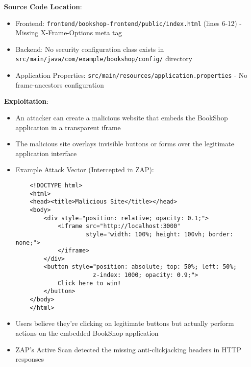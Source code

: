 \documentclass[]{UCD_CS_FYP_Report}
\begin{document}
\textbf{Source Code Location}: 
\begin{itemize}
    \item Frontend: \texttt{frontend/bookshop-frontend/public/index.html} (lines 6-12) - Missing X-Frame-Options meta tag
    \item Backend: No security configuration class exists in \texttt{src/main/java/com/example/bookshop/config/} directory
    \item Application Properties: \texttt{src/main/resources/application.properties} - No frame-ancestors configuration
\end{itemize}

\textbf{Exploitation}:
\begin{itemize}
    \item An attacker can create a malicious website that embeds the BookShop application in a transparent iframe
    \item The malicious site overlays invisible buttons or forms over the legitimate application interface
    \item Example Attack Vector (Intercepted in ZAP):
    \begin{verbatim}
    <!DOCTYPE html>
    <html>
    <head><title>Malicious Site</title></head>
    <body>
        <div style="position: relative; opacity: 0.1;">
            <iframe src="http://localhost:3000" 
                    style="width: 100%; height: 100vh; border: none;">
            </iframe>
        </div>
        <button style="position: absolute; top: 50%; left: 50%; 
                      z-index: 1000; opacity: 0.9;">
            Click here to win!
        </button>
    </body>
    </html>
    \end{verbatim}
    \item Users believe they're clicking on legitimate buttons but actually perform actions on the embedded BookShop application
    \item ZAP's Active Scan detected the missing anti-clickjacking headers in HTTP responses
\end{itemize}


\end{document}
